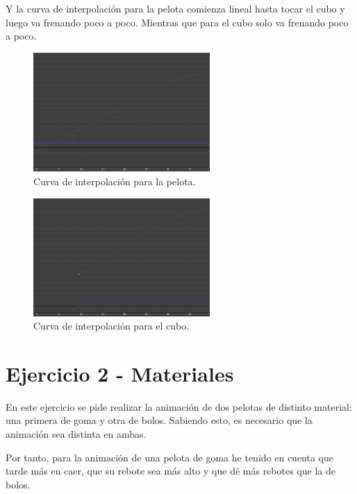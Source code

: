 \documentclass{article}
\begin{document}
Y la curva de interpolación para la pelota comienza lineal hasta tocar el cubo y luego va frenando poco a poco. Mientras que para el cubo solo va frenando poco a poco.

\bigskip

\begin{figure}[H]
    \centering
    \includegraphics[width=0.6\textwidth]{imagenes/Ejercicio 1/curva_p2.png}
    \caption{Curva de interpolación para la pelota.}
\end{figure}

\begin{figure}[H]
    \centering
    \includegraphics[width=0.6\textwidth]{imagenes/Ejercicio 1/curva_c2.png}
    \caption{Curva de interpolación para el cubo.}
\end{figure}


\section{Ejercicio 2 - Materiales}

En este ejercicio se pide realizar la animación de dos pelotas de distinto material: una primera de goma y otra de bolos. Sabiendo esto, es necesario que la animación sea distinta en ambas.

Por tanto, para la animación de una pelota de goma he tenido en cuenta que tarde más en caer, que su rebote sea más alto y que dé más rebotes que la de bolos.
\end{document}
